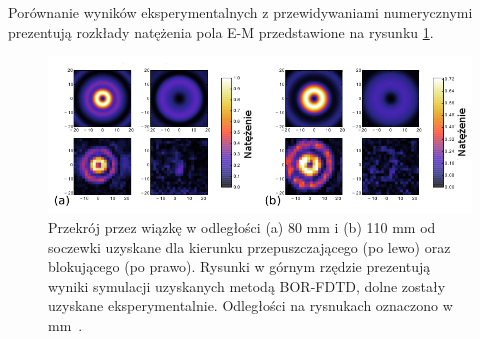 Porównanie wyników eksperymentalnych z przewidywaniami numerycznymi prezentują rozkłady natężenia pola E-M przedstawione na rysunku \ref{fig:eksp-por}.

\begin{figure}
	\includegraphics[width=\textwidth]{images/thz/exp-express.png}
	\caption{Przekrój przez wiązkę w odległości (a) 80 mm i (b) 110 mm od soczewki uzyskane dla kierunku przepuszczającego (po lewo) oraz blokującego (po prawo). Rysunki w górnym rzędzie prezentują wyniki symulacji uzyskanych metodą BOR-FDTD, dolne zostały uzyskane eksperymentalnie. Odległości na rysnukach oznaczono w mm~\cite{Yavorskiy:14}.}
	\label{fig:eksp-por}
\end{figure}
	

